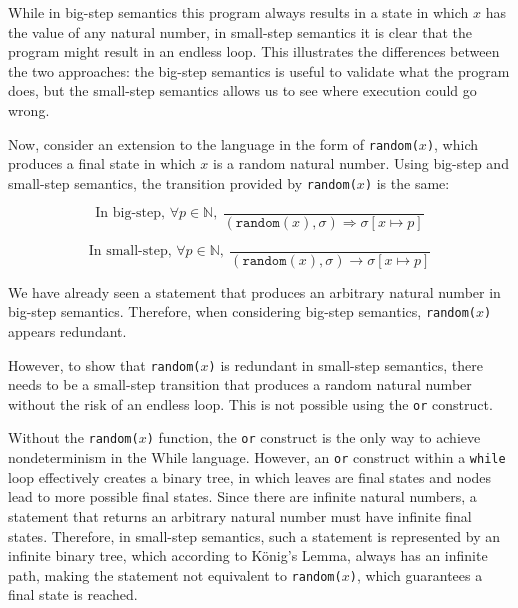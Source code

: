 \documentclass[11pt]{article}
\begin{document}
\begin{enumerate}
		While in big-step semantics this program always results in a state in which $x$ has the value of any natural number, in small-step semantics it is clear that the program might result in an endless loop.
		This illustrates the differences between the two approaches: the big-step semantics is useful to validate what the program does, but the small-step semantics allows us to see where execution could go wrong.
		
		Now, consider an extension to the language in the form of \texttt{random($x$)}, which produces a final state in which $x$ is a random natural number.
		Using big-step and small-step semantics, the transition provided by \texttt{random($x$)} is the same:
		
		\begin{equation*}
			\text{In big-step, }\forall p\in \mathbb{N},\ \frac{}{(\texttt{random}(x),\sigma)\Rightarrow\sigma[x\mapsto p]}
		\end{equation*}
		
		\begin{equation*}
			\text{In small-step, }\forall p\in \mathbb{N},\ \frac{}{(\texttt{random}(x),\sigma)\rightarrow\sigma[x\mapsto p]}
		\end{equation*}
		
		We have already seen a statement that produces an arbitrary natural number in big-step semantics. Therefore, when considering big-step semantics, \texttt{random($x$)} appears redundant.
		
		However, to show that \texttt{random($x$)} is redundant in small-step semantics, there needs to be a small-step transition that produces a random natural number without the risk of an endless loop. This is not possible using the \texttt{or} construct.
		
		Without the \texttt{random($x$)} function, the \texttt{or} construct is the only way to achieve nondeterminism in the While language. However, an \texttt{or} construct within a \texttt{while} loop effectively creates a binary tree, in which leaves are final states and nodes lead to more possible final states. Since there are infinite natural numbers, a statement that returns an arbitrary natural number must have infinite final states. Therefore, in small-step semantics, such a statement is represented by an infinite binary tree, which according to K\"onig's Lemma, always has an infinite path, making the statement not equivalent to \texttt{random($x$)}, which guarantees a final state is reached.
		

\end{enumerate}
\end{document}
